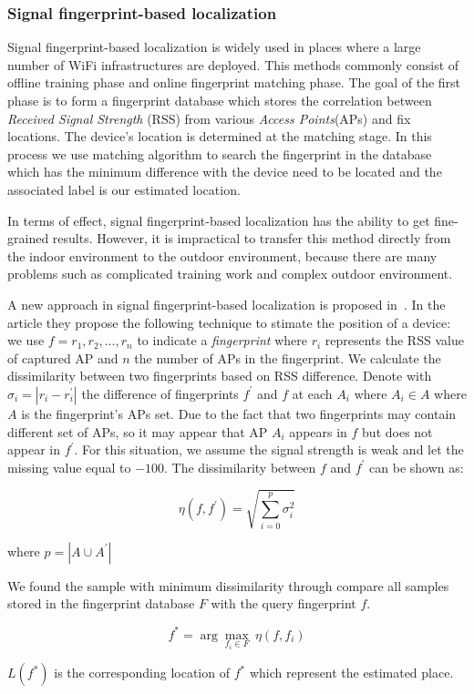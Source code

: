 \subsubsection{Signal fingerprint-based localization}
Signal fingerprint-based localization is widely used in places where a large number of WiFi infrastructures are deployed. This methods commonly consist of offline training phase
and online fingerprint matching phase. The goal of the first phase is to form a fingerprint database which stores the correlation between \textit{Received Signal Strength} (RSS) from
various \textit{Access Points}(APs) and fix locations. The device's location is determined at the matching stage. In this process we use matching algorithm to search the fingerprint
in the database which has the minimum difference with the device need to be located and the associated label is our estimated location.

In terms of effect, signal fingerprint-based localization has the ability to get fine-grained results. However, it is impractical to transfer this method directly from the indoor environment to the
outdoor environment, because there are many problems such as complicated training work and complex outdoor environment.

A new approach in signal fingerprint-based localization is proposed in~\cite{du2018hybrid}. In the article they propose the following technique to stimate the position 
of a device: we use $f = {r_1, r_2, \ldots, r_n}$ to indicate a \textit{fingerprint} where $r_i$ represents the RSS value of captured AP and $n$ the number of APs in the fingerprint.
We calculate the dissimilarity between two fingerprints based on RSS difference. Denote with $\sigma_i = | r_i - r^{'}_{i}|$ the difference of fingerprints $f^{'}$ and $f$ at each $A_i$ where
$A_i \in A$ where $A$ is the fingerprint's APs set. Due to the fact that two fingerprints may contain different set of APs, so it may appear that AP $A_i$ appears in $f$ but
does not appear in $f^{'}$. For this situation, we assume the signal strength is weak and let the missing value equal to $-100$. The dissimilarity between $f$ and $f^{'}$ can be shown as:

\begin{equation}
    \eta(f, f^{'}) = \sqrt{\sum_{i=0}^{p} \sigma_i^{2}}
\end{equation}

where $p = | A \cup A^{'} |$

We found the sample with minimum dissimilarity through compare all samples stored in the fingerprint database $F$ with the query fingerprint $f$.

\begin{equation}
    f^{*} = \arg \max_{f_i \in F} \ \eta(f, f_i)
\end{equation}

$L(f^{*})$ is the corresponding location of $f^{*}$ which represent the estimated place.
